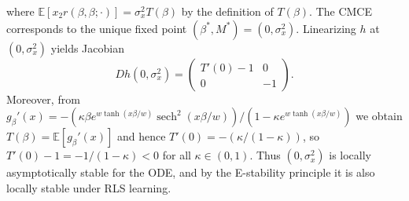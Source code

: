 where $\mathbb E[x_2 r(\beta,\beta;\cdot)]=\sigma_x^2 T(\beta)$ by the definition of $T(\beta)$. The CMCE corresponds to the unique fixed point $(\beta^*,M^*)=(0,\sigma_x^2)$. Linearizing $h$ at $(0,\sigma_x^2)$ yields Jacobian
\[
Dh(0,\sigma_x^2)=
\begin{pmatrix}
T'(0)-1 & 0\\
0 & -1
\end{pmatrix}.
\]
Moreover, from $g_\beta'(x)=-(\kappa\beta e^{w\tanh(x\beta/w)}\operatorname{sech}^2(x\beta/w))/(1-\kappa e^{w\tanh(x\beta/w)})$ we obtain
$T(\beta)=\mathbb E[g_\beta'(x)]$ and hence $T'(0)=-(\kappa/(1-\kappa))$, so $T'(0)-1=-1/(1-\kappa)<0$ for all $\kappa\in(0,1)$. Thus $(0,\sigma_x^2)$ is locally asymptotically stable for the ODE, and by the E-stability principle it is also locally stable under RLS learning.

